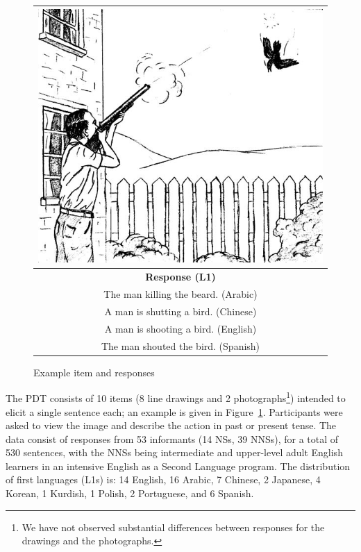 \begin{figure}
\begin{center}
\begin{tabular}{|c|}
\hline
\includegraphics[width=0.95\columnwidth]{figures/exampleprompt2.jpg}\\
\hline
\textbf{Response (L1)} \\
\hline
The man killing the beard. (Arabic)\\
\hline
A man is shutting a bird. (Chinese) \\
\hline
A man is shooting a bird. (English) \\
\hline
The man shouted the bird. (Spanish)\\
\hline
\end{tabular}
\end{center}
\caption{Example item and responses}
\label{fig:example-picture}
\end{figure}

The PDT consists of 10 items (8 line drawings and 2 photographs\footnote{We have not observed substantial differences between responses for the drawings and the photographs.}) intended to elicit a single sentence
each; an example is given in Figure~\ref{fig:example-picture}. Participants
were asked to view the image and describe the action in past or present tense.
The data consist of responses from 53 informants (14 NSs, 39 NNSs),
for a total of 530 sentences, with the NNSs being intermediate and
upper-level adult English learners in an intensive English as a Second
Language program.  The distribution of first languages (L1s) is: 14
English, 16 Arabic, 7 Chinese, 2 Japanese, 4 Korean, 1 Kurdish, 1
Polish, 2 Portuguese, and 6 Spanish.

